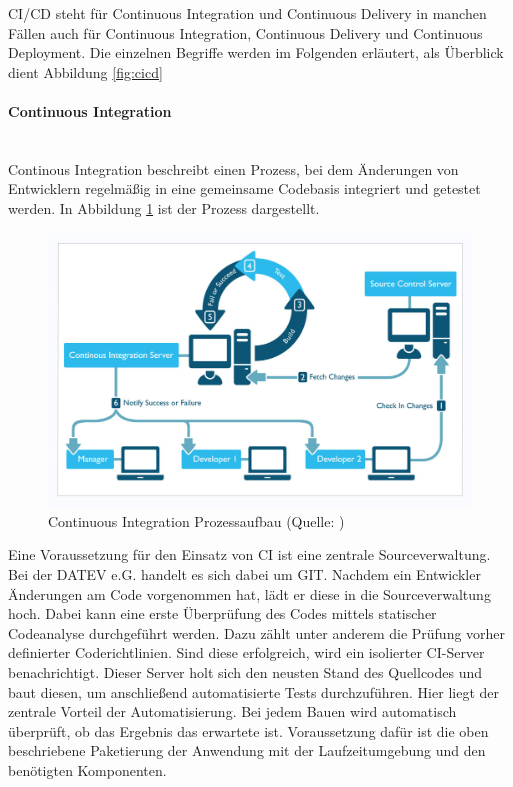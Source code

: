 CI/CD steht für \glqq Continuous Integration und Continuous Delivery\grqq{} in manchen Fällen auch für \glqq Continuous Integration, Continuous Delivery und Continuous Deployment\grqq{}.
Die einzelnen Begriffe werden im Folgenden erläutert, als Überblick dient Abbildung \ref{fig:cicd}
\paragraph{\glqq Continuous Integration\grqq}~\\
Continous Integration beschreibt einen Prozess, bei dem Änderungen von Entwicklern regelmäßig in eine gemeinsame Codebasis integriert und getestet werden.
In Abbildung \ref{fig:ci} ist der Prozess dargestellt.
\begin{figure}[h]
	\centering
	\includegraphics[width=\textwidth]{figures/CI.png}
	\caption{Continuous Integration Prozessaufbau (Quelle: \cite{.25.2.2020e})}
	\label{fig:ci}
\end{figure}
Eine Voraussetzung für den Einsatz von CI ist eine zentrale Sourceverwaltung.
Bei der DATEV e.G. handelt es sich dabei um GIT.
Nachdem ein Entwickler Änderungen am Code vorgenommen hat, lädt er diese in die Sourceverwaltung hoch.
Dabei kann eine erste Überprüfung des Codes mittels statischer Codeanalyse durchgeführt werden.
Dazu zählt unter anderem die Prüfung vorher definierter Coderichtlinien.
Sind diese erfolgreich, wird ein isolierter CI-Server benachrichtigt.
Dieser Server holt sich den neusten Stand des Quellcodes und baut diesen, um anschließend automatisierte Tests durchzuführen.
Hier liegt der zentrale Vorteil der Automatisierung. 
Bei jedem Bauen wird automatisch überprüft, ob das Ergebnis das erwartete ist.
Voraussetzung dafür ist die oben beschriebene Paketierung der Anwendung mit der Laufzeitumgebung und den benötigten Komponenten. 

